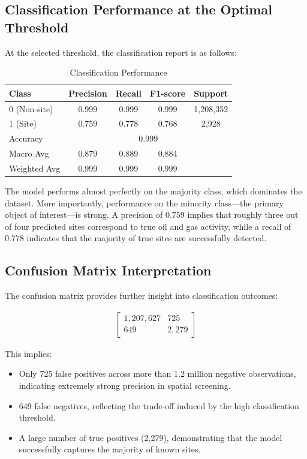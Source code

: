 \documentclass[12pt]{article}
\begin{document}
\subsection{Classification Performance at the Optimal Threshold}

At the selected threshold, the classification report is as follows:

\begin{table}[H]
\centering
\caption{Classification Performance}
\label{tab:classification_ext}
\begin{tabular}{lcccc}
\toprule
Class & Precision & Recall & F1-score & Support \\
\midrule
0 (Non-site) & 0.999 & 0.999 & 0.999 & 1{,}208{,}352 \\
1 (Site)     & 0.759 & 0.778 & 0.768 & 2{,}928 \\
\midrule
Accuracy     & \multicolumn{4}{c}{0.999} \\
Macro Avg    & 0.879 & 0.889 & 0.884 & \\
Weighted Avg & 0.999 & 0.999 & 0.999 & \\
\bottomrule
\end{tabular}
\end{table}

The model performs almost perfectly on the majority class, which dominates the dataset. More importantly, performance on the minority class—the primary object of interest—is strong. A precision of 0.759 implies that roughly three out of four predicted sites correspond to true oil and gas activity, while a recall of 0.778 indicates that the majority of true sites are successfully detected.

\subsection{Confusion Matrix Interpretation}

The confusion matrix provides further insight into classification outcomes:

\begin{align*}
\begin{bmatrix}
1{,}207{,}627 & 725 \\
649 & 2{,}279
\end{bmatrix}
\end{align*}

This implies:

\begin{itemize}
    \item Only 725 false positives across more than 1.2 million negative observations, indicating extremely strong precision in spatial screening.
    \item 649 false negatives, reflecting the trade-off induced by the high classification threshold.
    \item A large number of true positives (2,279), demonstrating that the model successfully captures the majority of known sites.
\end{itemize}
\end{document}
